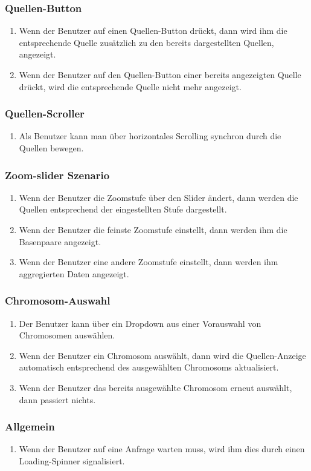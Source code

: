 \subsubsection{Quellen-Button}
\begin{enumerate}
	\item Wenn der Benutzer auf einen Quellen-Button drückt, dann wird ihm die entsprechende Quelle zusätzlich zu den bereits dargestellten Quellen, angezeigt.
	\item Wenn der Benutzer auf den Quellen-Button einer bereits angezeigten Quelle drückt, wird die entsprechende Quelle nicht mehr angezeigt.
\end{enumerate}

\subsubsection{Quellen-Scroller}
\begin{enumerate}
	\item Als Benutzer kann man über horizontales Scrolling synchron durch die Quellen bewegen.
\end{enumerate}

\subsubsection{Zoom-slider Szenario}
\begin{enumerate}
	\item Wenn der Benutzer die Zoomstufe über den Slider ändert, dann werden die Quellen entsprechend der eingestellten Stufe dargestellt.
	\item Wenn der Benutzer die feinste Zoomstufe einstellt, dann werden ihm die Basenpaare angezeigt.
	\item Wenn der Benutzer eine andere Zoomstufe einstellt, dann werden ihm aggregierten Daten angezeigt.
\end{enumerate}

\subsubsection{Chromosom-Auswahl}
\begin{enumerate}
	\item Der Benutzer kann über ein Dropdown aus einer Vorauswahl von Chromosomen auswählen.
	\item Wenn der Benutzer ein Chromosom auswählt, dann wird die Quellen-Anzeige automatisch entsprechend des ausgewählten Chromosoms aktualisiert.
	\item Wenn der Benutzer das bereits ausgewählte Chromosom erneut auswählt, dann passiert nichts.
\end{enumerate}

\subsubsection{Allgemein}
\begin{enumerate}
	\item Wenn der Benutzer auf eine Anfrage warten muss, wird ihm dies durch einen Loading-Spinner signalisiert.	
\end{enumerate}
\newpage